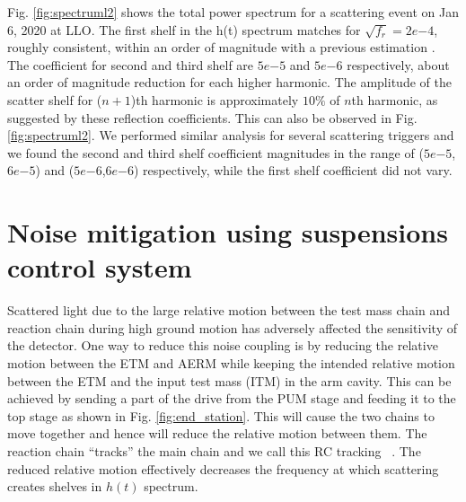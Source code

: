 \documentclass[12pt]{iopart}
\begin{document}
\begin{figure}[h]
\end{figure}


Fig. \ref{fig:spectruml2} shows the total power spectrum for a scattering event on Jan 6, 2020 at LLO. The first shelf in the h(t) spectrum matches for $\sqrt{f_{r}} = 2e{-4}$, roughly consistent, within an order of magnitude with a previous estimation \cite{hiro_calc}. The coefficient for second and third shelf are $5e{-5}$ and $5e{-6}$ respectively, about an order of magnitude reduction for each higher harmonic. The amplitude of the scatter shelf for ($n+1$)th harmonic is approximately $10 \%$ of $n$th harmonic, as suggested by these reflection coefficients. This can also be observed in Fig. \ref{fig:spectruml2}.  We performed similar analysis for several scattering triggers and we found the second and third shelf coefficient magnitudes in the range of ($5e{-5}$,$6e{-5}$) and ($5e{-6}$,$6e{-6}$) respectively, while the first shelf coefficient did not vary.  
\qquad



\section{Noise mitigation using suspensions control system} \label{rzero}

Scattered light due to the large relative motion between the test mass chain and reaction chain during high ground motion has adversely affected the sensitivity of the detector. 
One way to reduce this noise coupling is by reducing the relative motion between the ETM and AERM while keeping the intended relative motion between the ETM and the input test mass (ITM) in the arm cavity. This can be achieved by sending a part of the drive from the PUM stage and feeding it to the top stage as shown in Fig. \ref{fig:end_station}. This will cause the two chains to move together and hence will reduce the relative motion between them. The reaction chain ``tracks'' the main chain and we call this RC tracking ~\cite{alog_robert}.
The reduced relative motion effectively decreases the frequency at which scattering creates shelves in $h(t)$ spectrum. 
\end{document}
